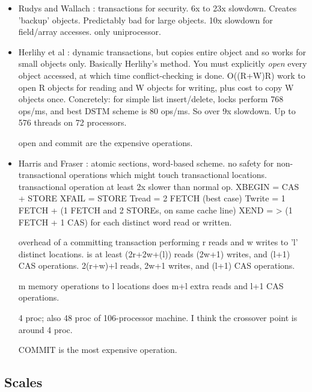 \documentclass[preprint]{rdbacmconf}
\begin{document}
{\begin{itemize}
  Performance: *at least* 5 fetches, 5 LL, and 4SC per location
  accessed.

  64 processors; no numbers presented for less than 10 processors.

  acquire/release/agree are expensive.

\item Rudys and Wallach \cite{RudysWa02}: transactions for security.
  6x to 23x slowdown.  Creates 'backup' objects.  Predictably bad
  for large objects.  10x slowdown for field/array accesses.
  only uniprocessor.

\item Herlihy et al \cite{HerlihyLuMoSc03}: dynamic transactions, but
  copies entire object and so works for small objects only.  Basically
  Herlihy's method.  You must explicitly \emph{open} every object
  accessed, at which time conflict-checking is done.
  O((R+W)R) work to open R objects for reading and W objects for
  writing, plus cost to copy W objects once.  Concretely: for simple
  list insert/delete, locks perform 768 ops/ms, and best DSTM scheme
  is 80 ops/ms.   So over 9x slowdown.
  Up to 576 threads on 72 processors.

  open and commit are the expensive operations.
\item Harris and Fraser \cite{HarrisFr03}: atomic sections, word-based
  scheme.  no safety for non-transactional operations which might
  touch transactional locations.  transactional operation at least 2x
  slower than normal op.
  XBEGIN = CAS + STORE
  XFAIL = STORE
  Tread = 2 FETCH (best case)
  Twrite = 1 FETCH + (1 FETCH and 2 STOREs, on same cache line)
  XEND = > (1 FETCH + 1 CAS) for each distinct word read or written.

  overhead of a committing transaction performing r reads and w writes
  to 'l' distinct locations.
  is at least (2r+2w+(l)) reads (2w+1) writes, and (l+1) CAS
  operations.  2(r+w)+l reads, 2w+1 writes, and (l+1) CAS operations.

m memory operations to l locations does m+l extra reads and l+1 CAS operations.

  4 proc; also 48 proc of 106-processor machine.  I think the
  crossover point is around 4 proc.

  COMMIT is the most expensive operation.
\end{itemize}
}


\subsection{Scales}
\end{document}
